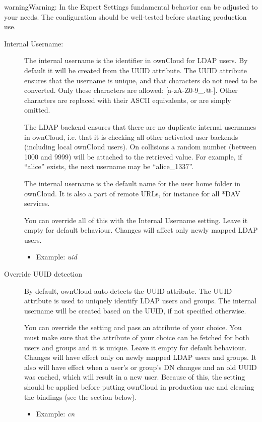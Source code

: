 \documentclass[letterpaper,10pt,english]{sphinxmanual}
\begin{document}
\begin{notice}{warning}{Warning:}
In the Expert Settings fundamental behavior can be adjusted to your needs. The
configuration should be well-tested before starting production use.
\end{notice}
\begin{description}
\item[{Internal Username:}] \leavevmode
The internal username is the identifier in ownCloud for LDAP users. By default
it will be created from the UUID attribute. The UUID attribute ensures that
the username is unique, and that characters do not need to be converted. Only
these characters are allowed: {[}a-zA-Z0-9\_.@-{]}. Other characters are
replaced with their ASCII equivalents, or are simply omitted.

The LDAP backend ensures that there are no duplicate internal usernames in
ownCloud, i.e. that it is checking all other activated user backends
(including local ownCloud users). On collisions a random number (between 1000
and 9999) will be attached to the retrieved value. For example, if ``alice''
exists, the next username may be ``alice\_1337''.

The internal username is the default name for the user home folder in
ownCloud. It is also a part of remote URLs, for instance for all *DAV
services.

You can override all of this with the Internal Username setting. Leave it
empty for default behaviour. Changes will affect only newly mapped LDAP users.
\begin{itemize}
\item {} 
Example: \emph{uid}

\end{itemize}

\item[{Override UUID detection}] \leavevmode
By default, ownCloud auto-detects the UUID attribute. The UUID attribute is
used to uniquely identify LDAP users and groups. The internal username will
be created based on the UUID, if not specified otherwise.

You can override the setting and pass an attribute of your choice. You must
make sure that the attribute of your choice can be fetched for both users and
groups and it is unique. Leave it empty for default behaviour. Changes will
have effect only on newly mapped LDAP users and groups. It also will
have effect when a user's or group's DN changes and an old UUID was cached,
which will result in a new user. Because of this, the setting should be
applied before putting ownCloud in production use and clearing the bindings
(see the  section below).
\begin{itemize}
\item {} 
Example: \emph{cn}


\end{itemize}
\end{description}
\end{document}
